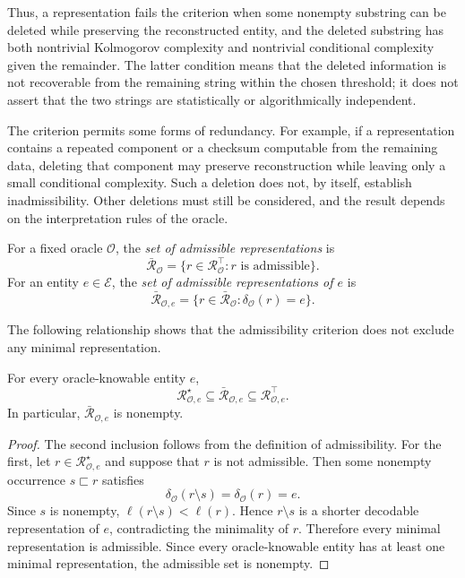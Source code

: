 Thus, a representation fails the criterion when some nonempty substring can be deleted while preserving the reconstructed entity, and the deleted substring has both nontrivial Kolmogorov complexity and nontrivial conditional complexity given the remainder. The latter condition means that the deleted information is not recoverable from the remaining string within the chosen threshold; it does not assert that the two strings are statistically or algorithmically independent.

The criterion permits some forms of redundancy. For example, if a representation contains a repeated component or a checksum computable from the remaining data, deleting that component may preserve reconstruction while leaving only a small conditional complexity. Such a deletion does not, by itself, establish inadmissibility. Other deletions must still be considered, and the result depends on the interpretation rules of the oracle.

\begin{definition}
\label{def:admissible_representation_sets}
For a fixed oracle $\mathcal O$, the \emph{set of admissible representations} is
\[
\bar{\mathcal R}_{\mathcal O} = \{r\in\mathcal R^\top_{\mathcal O}:r\text{ is admissible}\}.
\]
For an entity $e\in\mathcal E$, the \emph{set of admissible representations of $e$} is
\[
\bar{\mathcal R}_{\mathcal O,e} = \{r\in\bar{\mathcal R}_{\mathcal O}:\delta_{\mathcal O}(r)=e\}.
\]
\end{definition}

The following relationship shows that the admissibility criterion does not exclude any minimal representation.

\begin{proposition}
\label{prop:minimal_representations_admissible}
For every oracle-knowable entity $e$,
\[
\mathcal R^\star_{\mathcal O,e} \subseteq \bar{\mathcal R}_{\mathcal O,e} \subseteq
\mathcal R^\top_{\mathcal O,e}.
\]
In particular, $\bar{\mathcal R}_{\mathcal O,e}$ is nonempty.
\end{proposition}
\begin{proof}
The second inclusion follows from the definition of admissibility. For the first, let $r\in\mathcal R^\star_{\mathcal O,e}$ and suppose that $r$ is not admissible. Then some nonempty occurrence $s\sqsubset r$ satisfies
\[
\delta_{\mathcal O}(r\setminus s)=\delta_{\mathcal O}(r)=e.
\]
Since $s$ is nonempty, $\ell(r\setminus s)<\ell(r)$. Hence $r\setminus s$ is a shorter decodable representation of $e$, contradicting the minimality of $r$. Therefore every minimal representation is admissible. Since every oracle-knowable entity has at least one minimal representation, the admissible set is nonempty.
\end{proof}

